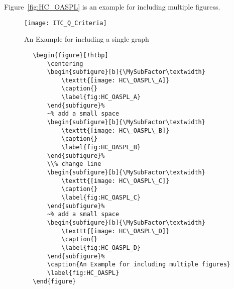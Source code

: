 Figure~\ref{fig:HC_OASPL} is an example for including multiple figuress. 
\begin{figure}[!htbp]
    \centering
    \texttt{[image: ITC\_Q\_Criteria]}
    \caption{An Example for including a single graph}
    \label{fig:ITC_Q_Criteria}
\end{figure}
\begin{center}
    \small
    \begin{verbatim}
        \begin{figure}[!htbp]
            \centering
            \begin{subfigure}[b]{\MySubFactor\textwidth}
                \texttt{[image: HC\_OASPL\_A]}
                \caption{}
                \label{fig:HC_OASPL_A}
            \end{subfigure}%
            ~% add a small space
            \begin{subfigure}[b]{\MySubFactor\textwidth}
                \texttt{[image: HC\_OASPL\_B]}
                \caption{}
                \label{fig:HC_OASPL_B}
            \end{subfigure}%
            \\% change line
            \begin{subfigure}[b]{\MySubFactor\textwidth}
                \texttt{[image: HC\_OASPL\_C]}
                \caption{}
                \label{fig:HC_OASPL_C}
            \end{subfigure}%
            ~% add a small space
            \begin{subfigure}[b]{\MySubFactor\textwidth}
                \texttt{[image: HC\_OASPL\_D]}
                \caption{}
                \label{fig:HC_OASPL_D}
            \end{subfigure}%
            \caption{An Example for including multiple figures}
            \label{fig:HC_OASPL}
        \end{figure}
    \end{verbatim}
\end{center}
